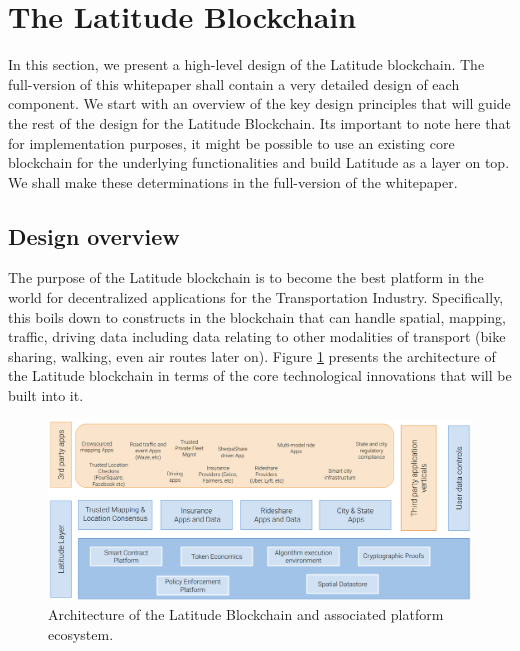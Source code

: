 \section{The Latitude Blockchain}\label{sec:design}

In this section, we present a high-level design of the Latitude blockchain. The full-version of this whitepaper shall
contain a very detailed design of each component. We start with an overview of the key design principles that will guide
the rest of the design for the Latitude Blockchain. Its important to note here that for implementation purposes, it
might be possible to use an existing core blockchain for the underlying functionalities and build Latitude as a layer on
top. We shall make these determinations in the full-version of the whitepaper.

\subsection{Design overview}

The purpose of the Latitude blockchain is to become the best platform in the world for decentralized applications for
the Transportation Industry. Specifically, this boils down to constructs in the blockchain that can handle spatial,
mapping, traffic, driving data including data relating to other modalities of transport (bike sharing, walking, even air
routes later on). Figure \ref{fig:lat-arch} presents the architecture of the Latitude blockchain in terms of the core
technological innovations that will be built into it.

\begin{figure}[t]
    \centering
    \includegraphics[width=1.00\textwidth]{latarch.png}
  \caption{Architecture of the Latitude Blockchain and associated platform ecosystem.}
    \label{fig:lat-arch}
\end{figure}

